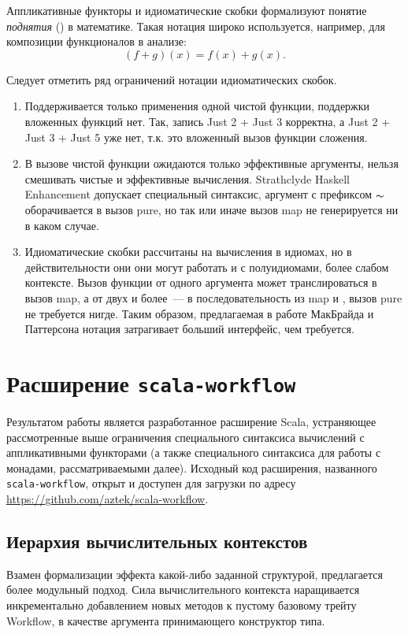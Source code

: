 Аппликативные функторы и идиоматические скобки формализуют понятие \emph{поднятия} () в математике\cite{Hinze}. Такая нотация широко используется, например, для композиции функционалов в анализе: $$(f + g)(x) = f(x) + g(x).$$

Следует отметить ряд ограничений нотации идиоматических скобок.
\begin{enumerate}
  \item Поддерживается только применения одной чистой функции, поддержки вложенных функций нет. Так, запись \<\llbracket Just 2 + Just 3 \rrbracket\> корректна, а \<\llbracket Just 2 + Just 3 + Just 5 \rrbracket\> уже нет, т.к. это вложенный вызов функции сложения.

  \item В вызове чистой функции ожидаются только эффективные аргументы, нельзя смешивать чистые и эффективные вычисления. Strathclyde Haskell Enhancement допускает специальный синтаксис, аргумент с префиксом $\thicksim$ оборачивается в вызов \<pure\>, но так или иначе вызов \<map\> не генерируется ни в каком случае.

  \item Идиоматические скобки рассчитаны на вычисления в идиомах, но в действительности они они могут работать и с полуидиомами, более слабом контексте. Вызов функции от одного аргумента может транслироваться в вызов \<map\>, а от двух и более~--- в последовательность из \<map\> и \<\circledast\>, вызов \<pure\> не требуется нигде. Таким образом, предлагаемая в работе МакБрайда и Паттерсона нотация затрагивает больший интерфейс, чем требуется.
\end{enumerate}

\section{Расширение \texttt{scala-workflow}}
Результатом работы является разработанное расширение Scala, устраняющее рассмотренные выше ограничения специального синтаксиса вычислений с аппликативными функторами (а также специального синтаксиса для работы с монадами, рассматриваемыми далее). Исходный код расширения, названного \texttt{scala-workflow}, открыт и доступен для загрузки по адресу \url{https://github.com/aztek/scala-workflow}.

\subsection{Иерархия вычислительных контекстов}
Взамен формализации эффекта какой-либо заданной структурой, предлагается более модульный подход. Сила вычислительного контекста наращивается инкрементально добавлением новых методов к пустому базовому трейту \<Workflow\>, в качестве аргумента принимающего конструктор типа.

